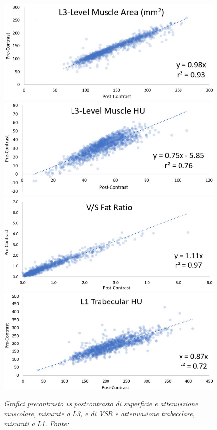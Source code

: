 \begin{figure}[htp]
\centering
\includegraphics[scale=0.49]{Immagini/perez_areamuscolo.png}\quad\includegraphics[scale=0.49]{Immagini/perez_attenuazionemuscolo.png}\quad\includegraphics[scale=0.49]{Immagini/perez_vsr.png}\quad\includegraphics[scale=0.49]{Immagini/perez_trabecole.png}
\caption{\label{fig:perez_correlazioni} \textit{Grafici precontrasto vs postcontrasto di superficie e attenuazione muscolare, misurate a L3, e di VSR e attenuazione trabecolare, misurati a L1. Fonte:} \cite{Perez2021}.}
\end{figure}

